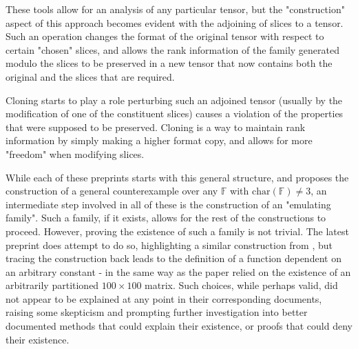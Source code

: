 \documentclass[12pt,a4paper,oneside]{book}
\def\field{\mathbb{F}} %
\theoremstyle{definition}
\begin{document}
These tools allow for an analysis of any particular tensor, but the "construction" aspect of this approach becomes evident with the adjoining of slices to a tensor. Such an operation changes the format of the original tensor with respect to certain "chosen" slices, and allows the rank information of the family generated modulo the slices to be preserved in a new tensor that now contains both the original and the slices that are required.

Cloning starts to play a role perturbing such an adjoined tensor (usually by the modification of one of the constituent slices) causes a violation of the properties that were supposed to be preserved. Cloning is a way to maintain rank information by simply making a higher format copy, and allows for more "freedom" when modifying slices.

While each of these preprints starts with this general structure, and \cite{shitov_higher_2024-1} proposes the construction of a general counterexample over any $\field$ with $\text{char}(\field) \neq 3$, an intermediate step involved in all of these is the construction of an "emulating family". Such a family, if it exists, allows for the rest of the constructions to proceed. However, proving the existence of such a family is not trivial. The latest preprint does attempt to do so, highlighting a similar construction from \cite{shitov_higher_2024}, but tracing the construction back leads to the definition of a function dependent on an arbitrary constant - in the same way as the paper \cite{shitov_counterexample_2018} relied on the existence of an arbitrarily partitioned $100 \times 100$ matrix. Such choices, while perhaps valid, did not appear to be explained at any point in their corresponding documents, raising some skepticism and prompting further investigation into better documented methods that could explain their existence, or proofs that could deny their existence.
\end{document}
